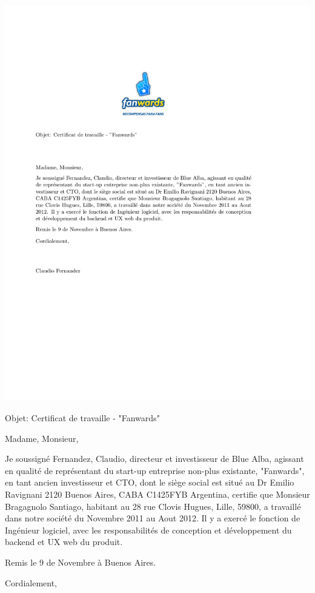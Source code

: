 \documentclass[11pt]{letter} %
\begin{document}

\begin{letter}{} 
\date{}%


\signature{Claudio Fernandez } %


    \includegraphics[width=0.3\linewidth, center] {fanwards}
   

Objet: Certificat de travaille - "Fanwards"

\opening{Madame, Monsieur,} 

Je soussigné Fernandez, Claudio, directeur et investisseur de Blue Alba, agissant en qualité de représentant du start-up entreprise non-plus existante, "Fanwards", en tant ancien investisseur et CTO, dont le siège social est situé au Dr Emilio Ravignani 2120 Buenos Aires, CABA C1425FYB Argentina, certifie que Monsieur Bragagnolo Santiago, habitant au 28 rue Clovis Hugues, Lille, 59800, a travaillé dans notre société du Novembre 2011 au Aout 2012. Il y a exercé le fonction de Ingénieur logiciel, avec les responsabilités de conception et développement du backend et UX web du produit.

Remis le 9 de Novembre à Buenos Aires. 


\closing{Cordialement,}




\end{letter}
\end{document}
